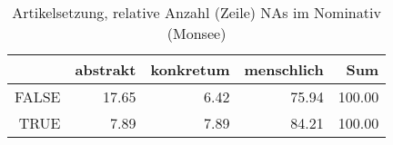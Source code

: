 \begin{table}[ht]
\centering
\begin{tabular}{rrrrr}
  \hline
 & abstrakt & konkretum & menschlich & Sum \\ 
  \hline
FALSE & 17.65 & 6.42 & 75.94 & 100.00 \\ 
  TRUE & 7.89 & 7.89 & 84.21 & 100.00 \\ 
   \hline
\end{tabular}
\caption{Artikelsetzung, relative Anzahl (Zeile) NAs im Nominativ (Monsee)} 
\end{table}
